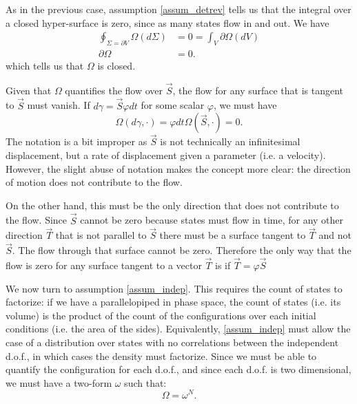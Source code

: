 \documentclass[10pt,twocolumn, nofootinbib]{revtex4-2}
\begin{document}
As in the previous case, assumption \ref{assum_detrev} tells us that the integral over a closed hyper-surface is zero, since as many states flow in and out. We have
\begin{equation}
	\begin{aligned}
		\oint_{\Sigma = \partial V} \Omega(d\Sigma) &= 0 = \int_V \partial \Omega(dV) \\
		\partial\Omega &= 0.
	\end{aligned}
\end{equation}
which tells us that $\Omega$ is closed.

Given that $\Omega$ quantifies the flow over $\vec{S}$, the flow for any surface that is tangent to $\vec{S}$ must vanish. If $d\gamma = \vec{S} \varphi dt$ for some scalar $\varphi$, we must have
\begin{equation}
	\Omega(d\gamma, \cdot) = \varphi dt \Omega(\vec{S}, \cdot) = 0.
\end{equation}
The notation is a bit improper as $\vec{S}$ is not technically an infinitesimal displacement, but a rate of displacement given a parameter (i.e. a velocity). However, the slight abuse of notation makes the concept more clear: the direction of motion does not contribute to the flow.

On the other hand, this must be the only direction that does not contribute to the flow. Since $\vec{S}$ cannot be zero because states must flow in time, for any other direction $\vec{T}$ that is not parallel to $\vec{S}$ there must be a surface tangent to $\vec{T}$ and not $\vec{S}$. The flow through that surface cannot be zero. Therefore the only way that the flow is zero for any surface tangent to a vector $\vec{T}$ is if $\vec{T}= \varphi \vec{S}$

We now turn to assumption \ref{assum_indep}. This requires the count of states to factorize: if we have a parallelopiped in phase space, the count of states (i.e. its volume) is the product of the count of the configurations over each initial conditions (i.e. the area of the sides). Equivalently, \ref{assum_indep} must allow the case of a distribution over states with no correlations between the independent d.o.f., in which cases the density must factorize. Since we must be able to quantify the configuration for each d.o.f., and since each d.o.f. is two dimensional, we must have a two-form $\omega$ such that:
\begin{equation}
	\Omega = \omega^N.
\end{equation}
\end{document}
